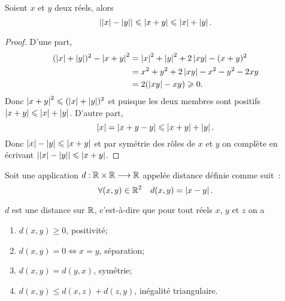   \begin{prop}
    Soient \(x\) et \(y\) deux réels, alors
    \begin{equation}
      \left\lvert\left\lvert x\right\rvert - \left\lvert y\right\rvert\right\rvert \leqslant \left\lvert x + y\right\rvert \leqslant \left\lvert x\right\rvert + \left\lvert y\right\rvert.
    \end{equation}
  \end{prop}
  \begin{proof}
    D'une part,
    \begin{align}
      (\left\lvert x\right\rvert + \left\lvert y\right\rvert)^2 - \left\lvert x + y\right\rvert^2 & = \left\lvert x\right\rvert^2 + \left\lvert y\right\rvert^2 +
      2\left\lvert xy\right\rvert - (x + y)^2\\
                                            & = x^2 + y^2 + 2\left\lvert xy\right\rvert - x^2 -
                                            y^2 - 2xy\\
                                            & = 2(\left\lvert xy\right\rvert - xy)\geqslant 0.
    \end{align}
    Donc \(\left\lvert x + y\right\rvert^2\leqslant (\left\lvert x\right\rvert + \left\lvert y\right\rvert)^2\) et puisque les deux
    membres sont positifs \(\left\lvert x + y\right\rvert\leqslant \left\lvert x\right\rvert + \left\lvert y\right\rvert\). D'autre
    part,
    \begin{equation}
      \left\lvert x\right\rvert = \left\lvert x + y - y\right\rvert\leqslant \left\lvert x + y\right\rvert + \left\lvert y\right\rvert.
    \end{equation}
    Donc \(\left\lvert x\right\rvert - \left\lvert y\right\rvert\leqslant \left\lvert x + y\right\rvert\) et par symétrie des rôles de
    \(x\) et \(y\) on complète en écrivant \(\left\lvert\left\lvert x\right\rvert - \left\lvert y\right\rvert\right\rvert\leqslant
    \left\lvert x + y\right\rvert\).
  \end{proof}
  \begin{defdef}
    Soit une application \(d:\mathbb{R}\times\mathbb{R} \longrightarrow{} \mathbb{R}\) appelée distance définie
    comme suit~:
    \begin{equation}
      \forall (x, y) \in \mathbb{R}^2 \quad d(x, y) = \left\lvert x - y\right\rvert.
    \end{equation}
  \end{defdef}
  \begin{prop}
    \(d\) est une distance sur \(\mathbb{R}\), c'est-à-dire que pour tout réels \(x\),
    \(y\) et \(z\) on a
    \begin{enumerate}
      \item \(d(x, y) \geqslant 0\), positivité;
      \item \(d(x, y) = 0 \iff x = y\), séparation;
      \item \(d(x, y) = d(y, x)\), symétrie;
      \item \(d(x, y) \leqslant d(x, z) + d(z, y)\), inégalité triangulaire.
    \end{enumerate}
  \end{prop}
